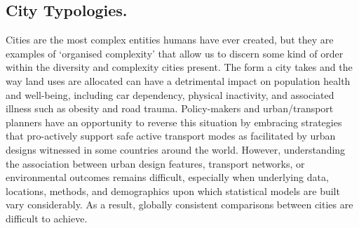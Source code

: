 \documentclass{nature}
\begin{document}




\subsection{City Typologies.}\label{sec:introduction2}
Cities are the most complex entities humans have ever created, but they are examples of `organised complexity' that allow us to discern some kind of order within the diversity and complexity cities present\cite{Kropf2014}. The form a city takes and the way land uses are allocated can have a detrimental impact on population health and well-being, including car dependency, physical inactivity, and associated illness such as obesity and road trauma\cite{Giles-corti2016, Kleinert2016, Goenka2016,Zapata-Diomedi2017, Heesch2014, Daley2011, Cepeda2016, MingWen2008, Norman2006, Thompson2018b}. Policy-makers and urban/transport planners have an opportunity to reverse this situation by embracing strategies that pro-actively support safe active transport modes as facilitated by urban designs witnessed in some countries around the world. However, understanding the association between urban design features, transport networks, or environmental outcomes remains difficult, especially when underlying data, locations, methods, and demographics upon which statistical models are built vary considerably. As a result, globally consistent comparisons between cities are difficult to achieve. 
\end{document}
